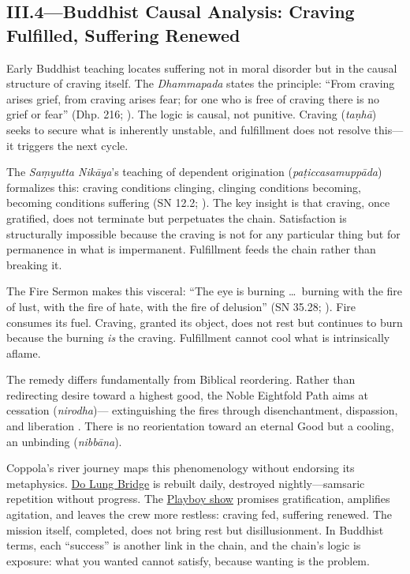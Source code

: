 \subsection*{III.4—Buddhist Causal Analysis: Craving Fulfilled, Suffering Renewed}
\label{ssec:iii-buddhist-causal-analysis}

Early Buddhist teaching locates suffering not in moral disorder but in the causal structure of
craving itself. The \emph{Dhammapada} states the principle: ``From craving arises grief, from
craving arises fear; for one who is free of craving there is no grief or fear'' (Dhp. 216;
\parencite{BuddharakkhitaDhp1993}). The logic is causal, not punitive. Craving (\emph{taṇhā})
seeks to secure what is inherently unstable, and fulfillment does not resolve this---it
triggers the next cycle.

The \emph{Saṃyutta Nikāya}'s teaching of dependent origination
(\emph{paṭiccasamuppāda}) formalizes this: craving conditions clinging, clinging conditions
becoming, becoming conditions suffering (SN 12.2; \parencite[p.~536]{BodhiSN2000}). The key
insight is that craving, once gratified, does not terminate
but perpetuates the chain. Satisfaction is structurally impossible because the craving is not
for any particular thing but for permanence in what is impermanent. Fulfillment feeds the
chain rather than breaking it.

The Fire Sermon makes this visceral: ``The eye is burning \ldots\ burning with the fire of
lust, with the fire of hate, with the fire of delusion'' (SN 35.28;
\parencite[p.~1143]{BodhiSN2000}). Fire consumes its fuel. Craving, granted its object, does
not rest but continues to burn because the burning \emph{is} the craving. Fulfillment cannot
cool what is intrinsically aflame.

The remedy differs fundamentally from Biblical reordering. Rather than redirecting desire
toward a highest good, the Noble Eightfold Path aims at cessation (\emph{nirodha})---
extinguishing the fires through disenchantment, dispassion, and liberation
\parencite[pp.~45--50]{Rahula1959}. There is no reorientation toward an eternal Good but a
cooling, an unbinding (\emph{nibbāna}).

Coppola's river journey maps this phenomenology without endorsing its metaphysics.
\hyperref[scene:do-lung-bridge]{Do Lung Bridge} is rebuilt daily, destroyed nightly---samsaric
repetition without progress. The \hyperref[scene:playboy-show]{Playboy show} promises
gratification, amplifies agitation, and leaves the crew more restless: craving fed, suffering
renewed. The mission itself, completed, does not bring rest but disillusionment.
In Buddhist terms, each ``success'' is another link in the chain, and the chain's logic is
exposure: what you wanted cannot satisfy, because wanting is the problem.
